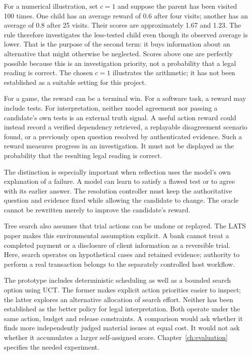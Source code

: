 For a numerical illustration, set $c=1$ and suppose the parent has been visited
100 times. One child has an average reward of 0.6 after four visits; another has
an average of 0.8 after 25 visits. Their scores are approximately 1.67 and 1.23.
The rule therefore investigates the less-tested child even though its observed
average is lower. That is the purpose of the second term: it buys information
about an alternative that might otherwise be neglected. Scores above one are
perfectly possible because this is an investigation priority, not a probability
that a legal reading is correct. The chosen $c=1$ illustrates the arithmetic;
it has not been established as a suitable setting for this project.


For a game, the reward can be a terminal win. For a software task, a reward may
include tests. For interpretation, neither model agreement nor passing a
candidate's own tests is an external truth signal. A useful action reward could
instead record a verified dependency retrieved, a replayable disagreement
scenario found, or a previously open question resolved by authenticated evidence.
Such a reward measures progress in an investigation. It must not be displayed as
the probability that the resulting legal reading is correct.

The distinction is especially important when reflection uses the model's own
explanation of a failure. A model can learn to satisfy a flawed test or to agree
with its earlier answer. The resolution controller must keep the authoritative
question and evidence fixed while allowing the candidate to change. The oracle
cannot be rewritten merely to improve the candidate's reward.

Tree search also assumes that trial actions can be undone or replayed.
The LATS paper makes this environmental assumption explicit. A bank
cannot treat a completed payment or a disclosure of client information
as a reversible trial. Here, search operates on hypothetical cases and
retained evidence; authority to perform a real transaction belongs to
the separately controlled host workflow.

The prototype includes deterministic scheduling as well as a bounded search
option using UCT. The former makes explicit action priorities easier to inspect;
the latter explores an alternative allocation of search effort. Neither has
been established as the better policy for legal interpretation. Both operate
under the same action, budget and release constraints. A comparison would ask whether it finds more independently judged
material issues at equal cost. It would not ask whether it accumulates a larger
self-assigned score. Chapter~\ref{ch:evaluation} specifies the needed experiment.

